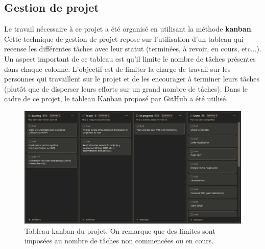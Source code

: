 \documentclass[french]{article}
\begin{document}
    \subsection{Gestion de projet}

    Le travail nécessaire à ce projet a été organisé en utilisant la méthode \textbf{kanban}. Cette technique de gestion de projet repose sur l'utilisation d'un tableau qui recense les différentes tâches avec leur statut (terminées, à revoir, en cours, etc...). Un aspect important de ce tableau est qu'il limite le nombre de tâches présentes dans chaque colonne. L'objectif est de limiter la charge de travail sur les personnes qui travaillent sur le projet et de les encourager à terminer leurs tâches (plutôt que de disperser leurs efforts sur un grand nombre de tâches). Dans le cadre de ce projet, le tableau Kanban proposé par GitHub a été utilisé.

    \begin{figure}[h!]
        \includegraphics[width=12cm]{kanban}
        \centering
        \caption{Tableau kanban du projet. On remarque que des limites sont imposées au nombre de tâches non commencées ou en cours.}
        \centering
    \end{figure}
\end{document}
